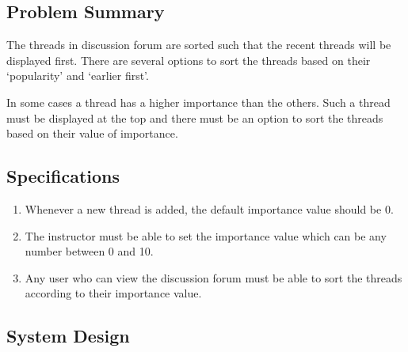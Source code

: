 \subsection{Problem Summary}

\hspace{0.35cm} The threads in discussion forum are sorted such that the recent threads will be displayed first. There are several options to sort the threads based on their `popularity' and `earlier first'.
\par In some cases a thread has a higher importance than the others. Such a thread must be displayed at the top and there must be an option to sort the threads based on their value of importance.

\subsection{Specifications}

\begin{enumerate}
	\item Whenever a new thread is added, the default importance value should be 0.
	\item The instructor must be able to set the importance value which can be any number between 0 and 10.
	\item Any user who can view the discussion forum must be able to sort the threads according to their importance value.
\end{enumerate}

\subsection{System Design}

